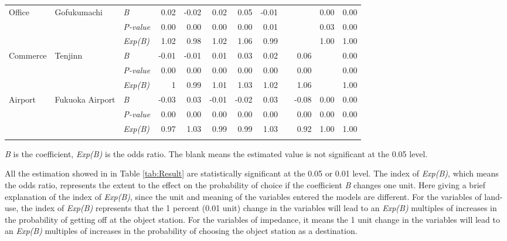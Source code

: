 \documentclass[utf8]{article}
\begin{document}
\begin{table}
\begin{tabular}{p{7em}p{5em}p{5em}<{\centering}rrrrrrrrr}
		\multirow{3}[0]{7em}{Office} & \multirow{3}[0]{5em}{Gofukumachi} & \textsl{B} & 0.02 & -0.02 & 0.02 & 0.05 & -0.01 & & & 0.00 & 0.00 \\
		& & \textsl{P-value} & 0.00 & 0.00 & 0.00 & 0.00 & 0.01 & & & 0.03 & 0.00 \\
		& & \textsl{Exp(B)} & 1.02 & 0.98 & 1.02 & 1.06 & 0.99 & & & 1.00 & 1.00 \\
		\midrule
		
		\multirow{3}[0]{7em}{Commerce} & \multirow{3}[0]{5em}{Tenjinn} & \textsl{B} & -0.01 & -0.01 & 0.01  & 0.03  & 0.02  & & 0.06 & & 0.00 \\
		& & \textsl{P-value} & 0.00 & 0.00 & 0.00 & 0.00  & 0.00 & & 0.00 & & 0.00 \\
		& & \textsl{Exp(B)} & 1 & 0.99 & 1.01 & 1.03 & 1.02 & & 1.06 & & 1.00 \\
		\midrule
		
		\multirow{3}[0]{7em}{Airport} & \multirow{3}[0]{5em}{Fukuoka Airport} & \textsl{B} & -0.03 & 0.03 & -0.01 & -0.02 & 0.03 & & -0.08 & 0.00 & 0.00 \\
		& & \textsl{P-value} & 0.00 & 0.00 & 0.00 & 0.00 & 0.00 & & 0.00 & 0.00 & 0.00 \\
		& & \textsl{Exp(B)} & 0.97 & 1.03 & 0.99 & 0.99 & 1.03 & & 0.92 & 1.00 & 1.00 \\
		\Xhline{1.5pt}
		
	\end{tabular}%
	\begin{description}
		\label{note:tab:Result}
		\item[*Note:] \textsl{B} is the coefficient, \textsl{Exp(B)} is the odds ratio. The blank means the estimated value is not significant at the 0.05 level.
	\end{description}

\end{table}%

%
All the estimation showed in in Table \ref{tab:Result} are statistically significant at the 0.05 or 0.01 level. The index of \textsl{Exp(B)}, which means the odds ratio, represents the extent to the effect on the probability of choice if the coefficient \textsl{B} changes one unit. Here giving a brief explanation of the index of \textsl{Exp(B)}, since the unit and meaning of the variables entered the models are different. For the variables of land-use, the index of \textsl{Exp(B)} represents that the 1 percent (0.01 unit) change in the variables will lead to an \textsl{Exp(B)} multiples of increases in the probability of getting off at the object station. For the variables of impedance, it means the 1 unit change in the variables will lead to an \textsl{Exp(B)} multiples of increases in the probability of choosing the object station as a destination. 
\end{document}
